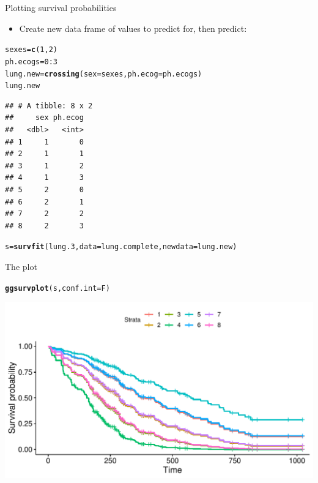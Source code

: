\documentclass[unknownkeysallowed]{beamer}\usepackage[]{graphicx}\usepackage[]{color}
\makeatletter
\def\maxwidth{ %
  \ifdim\Gin@nat@width>\linewidth
    \linewidth
  \else
    \Gin@nat@width
  \fi
}
\newcommand{\hlnum}[1]{\textcolor[rgb]{0.686,0.059,0.569}{#1}}%
\newcommand{\hlopt}[1]{\textcolor[rgb]{0,0,0}{#1}}%
\newcommand{\hlstd}[1]{\textcolor[rgb]{0.345,0.345,0.345}{#1}}%
\newcommand{\hlkwb}[1]{\textcolor[rgb]{0.69,0.353,0.396}{#1}}%
\newcommand{\hlkwc}[1]{\textcolor[rgb]{0.333,0.667,0.333}{#1}}%
\newcommand{\hlkwd}[1]{\textcolor[rgb]{0.737,0.353,0.396}{\textbf{#1}}}%
\newenvironment{kframe}{%
 \def\at@end@of@kframe{}%
 \ifinner\ifhmode%
  \def\at@end@of@kframe{\end{minipage}}%
  \begin{minipage}{\columnwidth}%
 \fi\fi%
 \def\FrameCommand##1{\hskip\@totalleftmargin \hskip-\fboxsep
 \colorbox{shadecolor}{##1}\hskip-\fboxsep
     \hskip-\linewidth \hskip-\@totalleftmargin \hskip\columnwidth}%
 \MakeFramed {\advance\hsize-\width
   \@totalleftmargin\z@ \linewidth\hsize
   \@setminipage}}%
 {\par\unskip\endMakeFramed%
 \at@end@of@kframe}
\newenvironment{knitrout}{}{} %
\makeatother
\begin{document}
\begin{frame}[fragile]{Plotting survival probabilities}

  \begin{itemize}
  \item Create new data frame of values to predict for, then predict:
  \end{itemize}

  
 
\begin{knitrout}\footnotesize
{}\color{fgcolor}\begin{kframe}
\begin{alltt}
\hlstd{sexes}\hlkwb{=}\hlkwd{c}\hlstd{(}\hlnum{1}\hlstd{,}\hlnum{2}\hlstd{)}
\hlstd{ph.ecogs}\hlkwb{=}\hlnum{0}\hlopt{:}\hlnum{3}
\hlstd{lung.new}\hlkwb{=}\hlkwd{crossing}\hlstd{(}\hlkwc{sex}\hlstd{=sexes,}\hlkwc{ph.ecog}\hlstd{=ph.ecogs)}
\hlstd{lung.new}
\end{alltt}
\begin{verbatim}
## # A tibble: 8 x 2
##     sex ph.ecog
##   <dbl>   <int>
## 1     1       0
## 2     1       1
## 3     1       2
## 4     1       3
## 5     2       0
## 6     2       1
## 7     2       2
## 8     2       3
\end{verbatim}
\begin{alltt}
\hlstd{s}\hlkwb{=}\hlkwd{survfit}\hlstd{(lung.3,}\hlkwc{data}\hlstd{=lung.complete,}\hlkwc{newdata}\hlstd{=lung.new)}
\end{alltt}
\end{kframe}
\end{knitrout}
  
 
\end{frame}


\begin{frame}[fragile]{The plot}

 
\begin{knitrout}
\color{fgcolor}\begin{kframe}
\begin{alltt}
\hlkwd{ggsurvplot}\hlstd{(s,}\hlkwc{conf.int}\hlstd{=F)}
\end{alltt}
\end{kframe}
\includegraphics[width=\maxwidth]{figure/unnamed-chunk-147-1} 

\end{knitrout}
  
  
\end{frame}
\end{document}

